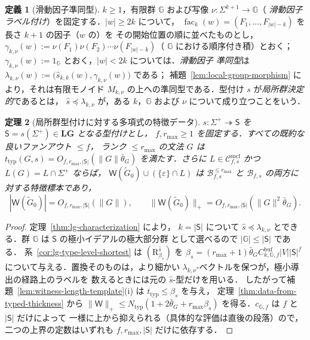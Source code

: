 \documentclass[11pt,a4paper]{ltjsarticle}
\numberwithin{equation}{section}
\theoremstyle{plain}
\newtheorem{theorem}{定理}[section]
\theoremstyle{definition}
\newtheorem{definition}[theorem]{定義}
\theoremstyle{remark}
\newcommand{\Wit}{\mathsf{W}}
\newcommand{\Cmcf}[2]{\mathcal{C}^{\mathrm{mcf}}_{#1,#2}}
\newcommand{\eps}{\varepsilon}
\theoremstyle{plain}
\begin{document}
\begin{definition}[滑動因子準同型]
\label{def:local-group-typing}
$k\ge1$，有限群 ${\mathbb G}$ および写像 $\nu:\Sigma^{k+1}\to {\mathbb G}$（
\emph{滑動因子ラベル付け}）を固定する．$|w|\ge2k$ について，
$\operatorname{fac}_k(w)=(F_1,\ldots,F_{|w|-k})$ を長さ $k+1$ の因子（$w$ の）を
その開始位置の順に並べたものとし，
$\gamma_{k,\nu}(w):=\nu(F_1)\nu(F_2)\cdots\nu(F_{|w|-k})$（
${\mathbb G}$ における順序付き積）とおく；$\gamma_{k,\nu}(w):=1_{\mathbb G}$ とおく，$|w|<2k$ については．\emph{滑動因子
準同型}は $\lambda_{k,\nu}(w):=\bigl(\widehat s_{k,k}(w),\gamma_{k,\nu}(w)\bigr)$ である；
補題~\ref{lem:local-group-morphism} により，それは有限モノイド
$M_{k,\nu}$ の上への準同型である．型付け $s$ が\emph{局所群決定的}であるとは，
$\widehat s\preceq\lambda_{k,\nu}$ が，ある $k$，${\mathbb G}$ および $\nu$ について成り立つことをいう．
\end{definition}

\begin{theorem}[局所群型付けに対する多項式の特徴データ]
\label{thm:local-group-polydata}
$s:\Sigma^+\twoheadrightarrow\mathsf S$ を
$\mathsf S=s(\Sigma^+)\in\mathbf{LG}$ となる型付けとし，
$f,r_{\max}\ge1$ を固定する．すべての既約な良いファンアウト $\le f$，
ランク $\le r_{\max}$ の文法 $G$ は
$t_{\mathrm{typ}}(G,s)=O_{f,r_{\max},|\mathsf S|}(\|G\|\bar\theta_G)$ を満たす．さらに
$L\in\Cmcf{f}{s}$ かつ $L(G)=L\cap\Sigma^+$ ならば，
$\Wit(\widetilde G_0)\cup(\{\eps\}\cap L)$ は
$\mathcal B^{\le r_{\max}}_{f,s}$ と $\mathcal B_{f,s}$ の両方に対する特徴標本であり，
\[
 |\Wit(\widetilde G_0)|=O_{f,r_{\max},|\mathsf S|}(\|G\|),\qquad
 \|\Wit(\widetilde G_0)\|_+=O_{f,r_{\max},|\mathsf S|}(\|G\|^2\bar\theta_G).
\]
\end{theorem}

\begin{proof}
定理~\ref{thm:lg-characterization} により，
$k=|\mathsf S|$ について $\widehat s\preceq\lambda_{k,\nu}$
とできる．群 $\mathbb G$ は $\mathsf S$ の極小イデアルの極大部分群
として選べるので $|{\mathbb G}|\le|\mathsf S|$ である．
系~\ref{cor:lg-type-level-shortest} は
$(\mathrm R_{\beta_s}^{\widehat s})$ を
$\beta_s=(r_{\max}+1)\bar\theta_G
C^{\mathrm{buf}}_{k,{\mathbb G},f}|V||\mathsf S|^f$
について与える．置換そのものは，より細かい
$\lambda_{k,\nu}$-ベクトルを保つが，極小導出の経路上のラベルを
数えるときには元の $\widehat s$-型だけを用いる．
したがって補題~\ref{lem:witness-length-template}(i) は
$t_{\mathrm{typ}}\le\beta_s$ を与え，
定理~\ref{thm:data-from-typed-thickness} から
$\|\Wit\|_+\le N_{\mathrm{typ}}(1+2\bar\theta_G+r_{\max}\beta_s)$
を得る．$c_{{\mathbb G},f}$ は $f$ と $|\mathsf S|$ だけによって
一様に上から抑えられる（具体的な評価は直後の段落）ので，
二つの上界の定数はいずれも $f,r_{\max},|\mathsf S|$ だけに依存する．
\end{proof}
\end{document}
